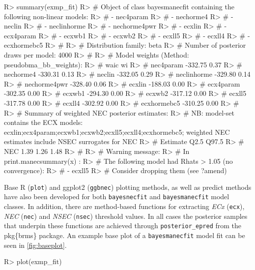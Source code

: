 \documentclass[
]{jss}
\begin{document}
\begin{CodeChunk}
\begin{CodeInput}
R> summary(exmp_fit)
R> # Object of class bayesmanecfit containing the following non-linear models:
R> #   -  nec4param
R> #   -  nechorme4
R> #   -  neclin
R> #   -  neclinhorme
R> #   -  nechorme4pwr
R> #   -  ecxlin
R> #   -  ecx4param
R> #   -  ecxwb1
R> #   -  ecxwb2
R> #   -  ecxll5
R> #   -  ecxll4
R> #   -  ecxhormebc5
R> # 
R> # Distribution family: beta
R> # Number of posterior draws per model:  4000
R> # 
R> # Model weights (Method: pseudobma_bb_weights):
R> #                 waic   wi
R> # nec4param    -332.75 0.37
R> # nechorme4    -330.31 0.13
R> # neclin       -332.05 0.29
R> # neclinhorme  -329.80 0.14
R> # nechorme4pwr -328.40 0.06
R> # ecxlin       -188.03 0.00
R> # ecx4param    -302.35 0.00
R> # ecxwb1       -294.30 0.00
R> # ecxwb2       -317.12 0.00
R> # ecxll5       -317.78 0.00
R> # ecxll4       -302.92 0.00
R> # ecxhormebc5  -310.25 0.00
R> # 
R> # Summary of weighted NEC posterior estimates:
R> # NB: model-set contains the ECX models: ecxlin;ecx4param;ecxwb1;ecxwb2;ecxll5;ecxll4;ecxhormebc5; weighted NEC estimates include NSEC surrogates for NEC
R> #     Estimate Q2.5 Q97.5
R> # NEC     1.39 1.26  1.48
R> # 
R> # Warning message:
R> # In print.manecsummary(x) :
R> #   The following model had Rhats > 1.05 (no convergence):
R> #   -  ecxll5
R> # Consider dropping them (see ?amend)
\end{CodeInput}
\end{CodeChunk}

Base R (\texttt{plot}) and ggplot2 (\texttt{ggbnec}) plotting methods,
as well as predict methods have also been developed for both
\texttt{bayesnecfit} and \texttt{bayesmanecfit} model classes. In
addition, there are method-based functions for extracting \emph{ECx}
(\texttt{ecx}), \emph{NEC} (\texttt{nec}) and \emph{NSEC}
(\texttt{nsec}) threshold values. In all cases the posterior samples
that underpin these functions are achieved through
\texttt{posterior\_epred} from the pkg\{brms\} package. An example base
plot of a \texttt{bayesmanecfit} model fit can be seen in
\autoref{fig:baseplot}.

\begin{CodeChunk}
\begin{CodeInput}
R> plot(exmp_fit)
\end{CodeInput}
\end{CodeChunk}
\end{document}
